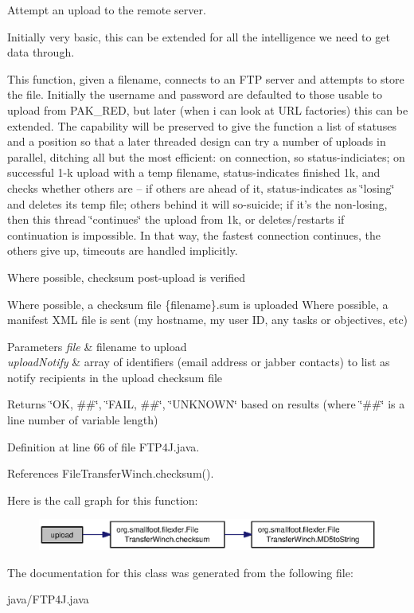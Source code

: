 Attempt an upload to the remote server. 

Initially very basic, this can be extended for all the intelligence we need to get data through.

This function, given a filename, connects to an F\-T\-P server and attempts to store the file. Initially the username and password are defaulted to those usable to upload from P\-A\-K\-\_\-\-R\-E\-D, but later (when i can look at U\-R\-L factories) this can be extended. The capability will be preserved to give the function a list of statuses and a position so that a later threaded design can try a number of uploads in parallel, ditching all but the most efficient\-: on connection, so status-\/indiciates; on successful 1-\/k upload with a temp filename, status-\/indicates finished 1k, and checks whether others are -- if others are ahead of it, status-\/indicates as \char`\"{}losing\char`\"{} and deletes its temp file; others behind it will so-\/suicide; if it's the non-\/losing, then this thread \char`\"{}continues\char`\"{} the upload from 1k, or deletes/restarts if continuation is impossible. In that way, the fastest connection continues, the others give up, timeouts are handled implicitly.

Where possible, checksum post-\/upload is verified

Where possible, a checksum file \{filename\}.sum is uploaded Where possible, a manifest X\-M\-L file is sent (my hostname, my user I\-D, any tasks or objectives, etc)


\begin{DoxyParams}{Parameters}
{\em file} & filename to upload \\
\hline
{\em upload\-Notify} & array of identifiers (email address or jabber contacts) to list as notify recipients in the upload checksum file \\
\hline
\end{DoxyParams}
\begin{DoxyReturn}{Returns}
\char`\"{}\-O\-K, \#\#\char`\"{}, \char`\"{}\-F\-A\-I\-L, \#\#\char`\"{}, \char`\"{}\-U\-N\-K\-N\-O\-W\-N\char`\"{} based on results (where \char`\"{}\#\#\char`\"{} is a line number of variable length) 
\end{DoxyReturn}


Definition at line 66 of file F\-T\-P4\-J.\-java.



References File\-Transfer\-Winch.\-checksum().



Here is the call graph for this function\-:\nopagebreak
\begin{figure}[H]
\begin{center}
\leavevmode
\includegraphics[width=350pt]{classorg_1_1smallfoot_1_1filexfer_1_1FTP4J_afa3dfccec4b989cafc56103eb1ee82a6_cgraph}
\end{center}
\end{figure}




The documentation for this class was generated from the following file\-:\begin{DoxyCompactItemize}
\item 
java/F\-T\-P4\-J.\-java\end{DoxyCompactItemize}
